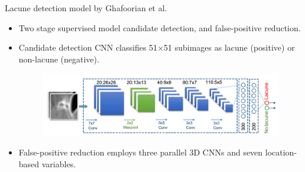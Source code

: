 \documentclass{beamer}
\begin{document}
\begin{frame}{Lacune detection model by Ghafoorian et al.}
\begin{itemize}
\item Two stage supervised model \citep{GhafoorianM.2017Dml3} candidate detection, and false-positive reduction.
\item Candidate detection CNN classifies 51$\times$51 subimages as lacune (positive) or non-lacune (negative).
\begin{figure}
\centering
\includegraphics[width=\linewidth]{../Thesis_Docs/Images/5_ghafoorian_model1.png}
\end{figure}
\item False-positive reduction employs three parallel 3D CNNs and seven location-based variables.
\end{itemize}
\end{frame}
\end{document}
